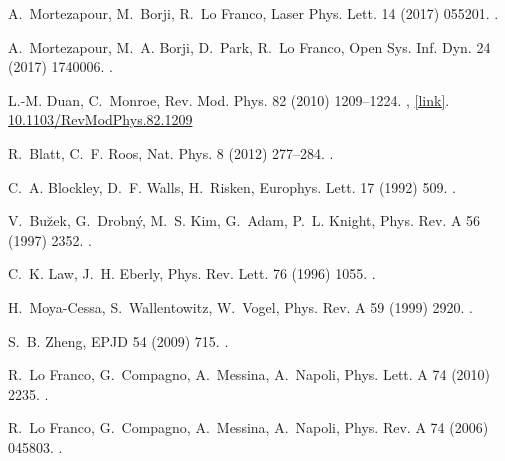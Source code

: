 \documentclass[twocolumn,3p,times]{elsarticle}
\begin{document}
\begin{thebibliography}{10}
A.~Mortezapour, M.~Borji, R.~{Lo Franco}, Laser Phys. Lett. 14 (2017) 055201.
\newblock \href {http://dx.doi.org/10.1088/1612-202X/aa63c5}
  {}.

A.~Mortezapour, M.~A. Borji, D.~Park, R.~{Lo Franco}, Open Sys. Inf. Dyn. 24
  (2017) 1740006.
\newblock \href {http://dx.doi.org/10.1142/S1230161217400066}
  {}.

L.-M. Duan, C.~Monroe, Rev. Mod. Phys. 82 (2010) 1209--1224.
\newblock \href {http://dx.doi.org/10.1103/RevModPhys.82.1209}
  {},
  \href{10.1103/RevModPhys.82.1209}{[link]}.
\newline\urlprefix\url{10.1103/RevModPhys.82.1209}

R.~Blatt, C.~F. Roos, Nat. Phys. 8 (2012) 277--284.
\newblock \href {http://dx.doi.org/10.1038/nphys2252}
  {}.

C.~A. Blockley, D.~F. Walls, H.~Risken, Europhys. Lett. 17 (1992) 509.
\newblock \href {http://dx.doi.org/10.1209/0295-5075/17/6/006}
  {}.

V.~Bu\u{z}ek, G.~Drobn\'{y}, M.~S. Kim, G.~Adam, P.~L. Knight, Phys. Rev. A 56
  (1997) 2352.
\newblock \href {http://dx.doi.org/10.1103/PhysRevA.56.2352}
  {}.

C.~K. Law, J.~H. Eberly, Phys. Rev. Lett. 76 (1996) 1055.
\newblock \href {http://dx.doi.org/10.1103/PhysRevLett.76.1055}
  {}.

H.~Moya-Cessa, S.~Wallentowitz, W.~Vogel, Phys. Rev. A 59 (1999) 2920.
\newblock \href {http://dx.doi.org/10.1103/PhysRevA.59.2920}
  {}.

S.~B. Zheng, EPJD 54 (2009) 715.
\newblock \href {http://dx.doi.org/10.1140/epjd/e2009-00185-6}
  {}.

R.~{Lo Franco}, G.~Compagno, A.~Messina, A.~Napoli, Phys. Lett. A 74 (2010)
  2235.
\newblock \href {http://dx.doi.org/10.1016/j.physleta.2010.03.036}
  {}.

R.~{Lo Franco}, G.~Compagno, A.~Messina, A.~Napoli, Phys. Rev. A 74 (2006)
  045803.
\newblock \href {http://dx.doi.org/10.1103/PhysRevA.74.045803}
  {}.


\end{thebibliography}
\end{document}
